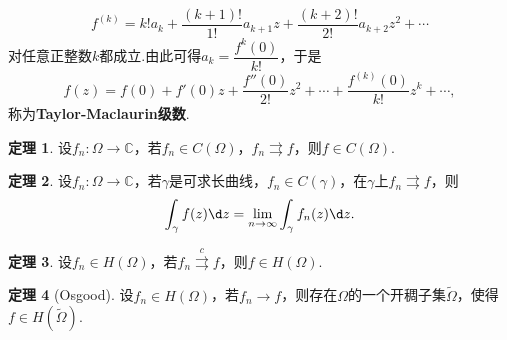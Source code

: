 \documentclass[12pt]{ctexart}
\theoremstyle{definition}
\newtheorem{theorem}{定理}
\theoremstyle{plain}
\begin{document}
	$$f^{(k)}=k!a_k+\frac{(k+1)!}{1!}a_{k+1}z+\frac{(k+2)!}{2!}a_{k+2}z^2+\cdots$$
	对任意正整数$k$都成立.由此可得$a_k=\dfrac{f^k(0)}{k!}$，于是
	$$f(z)=f(0)+f'(0)z+\frac{f''(0)}{2!}z^2+\cdots+\frac{f^{(k)}(0)}{k!}z^k+\cdots,$$
	称为\textbf{Taylor-Maclaurin级数}.
	\begin{theorem}
		设$f_n:\varOmega\to\mathbb{C}$，若$f_n\in C(\varOmega)$，$f_n\rightrightarrows f$，则$f\in C(\varOmega)$.
	\end{theorem}
	\begin{theorem}
		设$f_n:\varOmega\to\mathbb{C}$，若$\gamma$是可求长曲线，$f_n\in C(\gamma)$，在$\gamma$上$f_n\rightrightarrows f$，则
		$$\int_{\gamma}f(z)\d z=\lim\limits_{n\to\infty}\int_{\gamma}f_n(z)\d z.$$
	\end{theorem}
	\begin{theorem}
		设$f_n\in H(\varOmega)$，若$f_n\stackrel{c}{\rightrightarrows}f$，则$f\in H(\varOmega)$.
	\end{theorem}
	\begin{theorem}[Osgood]
		设$f_n\in H(\varOmega)$，若$f_n\rightarrow f$，则存在$\varOmega$的一个开稠子集$\tilde{\varOmega}$，使得$f\in H(\tilde{\varOmega})$.
	\end{theorem}
\end{document}
